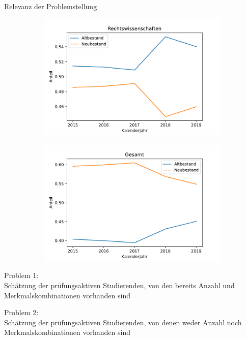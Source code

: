 \documentclass[17pt, fleqn]{beamer}
\begin{document}
\begin{frame}{Relevanz der Problemstellung}
\begin{figure}[ht]
\begin{subfigure}{0.49\textwidth}
            \includegraphics[width = 1\textwidth]{jus2.pdf}
        \end{subfigure}
        \begin{subfigure}{0.49\textwidth}
            
            \includegraphics[width = 1\textwidth]{ges2.pdf}
        \end{subfigure}
            
    \end{figure}
    
\end{frame}

\begin{frame}
    Problem 1: \\
    Schätzung der prüfungsaktiven Studierenden, von den bereits Anzahl und Merkmalskombinationen vorhanden sind \\[1cm]

    \pause

    Problem 2: \\
    Schätzung der prüfungsaktiven Studierenden, von denen weder Anzahl noch Merkmalskombinationen vorhanden sind    
\end{frame}
\end{document}
